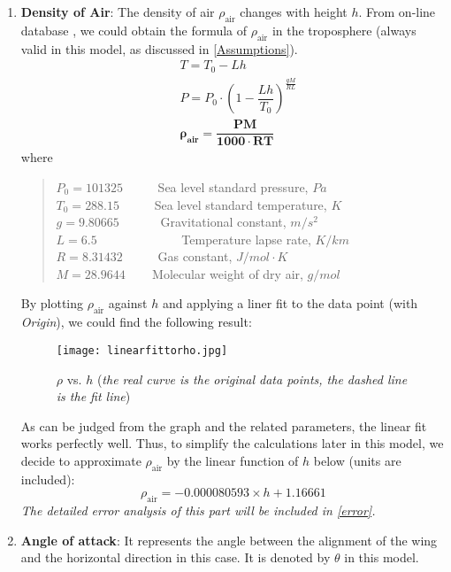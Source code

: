 \documentclass[a4paper,11pt]{article}
\begin{document}
\begin{spacing}{1.0}
\begin{enumerate}
	\item \textbf{Density of Air}: The density of air $\rho_\text{air}$ changes with height $h$. From on-line database \cite{rho}, we could obtain the formula of $\rho_\text{air}$ in the  troposphere (always valid in this model, as discussed in \ref{Assumptions}).
	\begin{align*}
	& T = T_0 - Lh
	\\& P = P_0\cdot\left(1 - \dfrac{Lh}{T_0}\right)^{\frac{gM}{RL}}
	\\& \bm{\rho_\text{air}}\bm{ =} \dfrac{\bm{PM}}{\bm{1000\cdot RT}}
	\end{align*}
	where
	\begin{quote}
			$P_0 = 101325$  ~~~~~Sea level standard pressure, $\unit{Pa}$\\
			$T_0 = 288.15$ ~~~~~Sea level standard temperature, $\unit{K}$ \\
			$g = 9.80665$  ~~~~~~Gravitational constant, $\unit{m/s^2}$ \\
			$L = 6.5$   ~~~~~~~~~~~~~Temperature lapse rate, $\unit{K/km}$\\
			$R = 8.31432$  ~~~~~Gas constant, $\unit{J/ mol\cdot K} $ \\
			$M=28.9644$ ~~~ Molecular weight of dry air, $\unit{g/mol}$
 	
	\end{quote}
	By plotting $\rho_\text{air}$ against $h$ and applying a liner fit to the data point (with \textit{Origin}), we could find the following result:
	\begin{figure}[H]
		\centering
		\texttt{[image: linearfittorho.jpg]}
		\caption{$\rho$ vs. $h$ (\textit{the real curve is the original data points, the dashed line is the fit line})}
	\end{figure}
	As can be judged from the graph and the related parameters, the linear fit works perfectly well. Thus, to simplify the calculations later in this model, we decide to approximate $\rho_\text{air}$ by the linear function of $h$ below (units are included):
	\begin{equation}
	\rho_\text{air} = -0.000080593\times h + 1.16661
	\end{equation}
	\textit{The detailed error analysis of this part will be included in \ref{error}.}
	
	\item \textbf{Angle of attack}: It represents the angle between the alignment of the wing and the horizontal direction in this case. It is denoted by $\theta$ in this model.
	

\end{enumerate}
\end{spacing}
\end{document}
